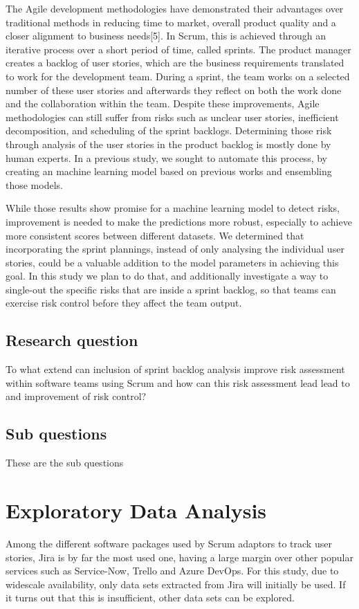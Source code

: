\documentclass[sigconf]{acmart}
\begin{document}
The Agile development methodologies have demonstrated their advantages over traditional methods in reducing time to market, overall product quality and a closer alignment to business needs[5]. 
In Scrum, this is achieved through an iterative process over a short period of time, called sprints. The product manager creates a backlog of user stories, which are the business requirements translated to work for the development team. 
During a sprint, the team works on a selected number of these user stories and afterwards they reflect on both the work done and the collaboration within the team.
Despite these improvements, Agile methodologies can still suffer from risks such as unclear user stories, inefficient decomposition, and scheduling of the sprint backlogs. 
Determining those risk through analysis of the user stories in the product backlog is mostly done by human experts. 
In a previous study, we sought to automate this process, by creating an machine learning model based on previous works and ensembling those models. 

While those results show promise for a machine learning model to detect risks, improvement is needed to make the predictions more robust, especially to achieve more consistent scores between different datasets.
We determined that incorporating the sprint plannings, instead of only analysing the individual user stories, could be a valuable addition to the model parameters in achieving this goal. In this study we plan to do that, and additionally investigate a way to single-out the specific risks that are inside a sprint backlog, so that teams can exercise risk control before they affect the team output.

\subsection{Research question}
To what extend can inclusion of sprint backlog analysis improve risk assessment within software teams using Scrum and how can this risk assessment lead lead to and improvement of risk control?

\subsection{Sub questions}
These are the sub questions

\section{Exploratory Data Analysis}
Among the different software packages used by Scrum adaptors to track user stories, Jira is by far the most used one, having a large margin over other popular services such as Service-Now, Trello and Azure DevOps.
For this study, due to widescale availability, only data sets extracted from Jira will initially be used. If it turns out that this is insufficient, other data sets can be explored.
\end{document}
